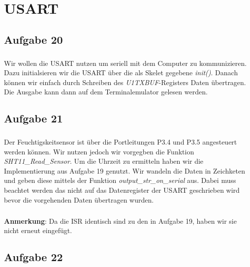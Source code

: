 \chapter{USART}

\section*{Aufgabe 20}

\paragraph*{}
Wir wollen die USART nutzen um seriell mit dem Computer zu kommunizieren. Dazu initialsieren wir die USART über die als Skelet gegebene {\em init()}. Danach können wir einfach durch Schreiben des {\em U1TXBUF}-Registers Daten übertragen. Die Ausgabe kann dann auf dem Terminalemulator gelesen werden.\\



\section*{Aufgabe 21}

\paragraph*{}
Der Feuchtigskeitsensor ist über die Portleitungen P3.4 und P3.5 angesteuert werden können. Wir nutzen jedoch wir vorgegben die Funktion {\em SHT11\_Read\_Sensor}. Um die Uhrzeit zu ermitteln haben wir die Implementierung aus Aufgabe 19 genutzt. Wir wandeln die Daten in Zeichketen und geben diese mittels der Funktion {\em output\_str\_on\_serial} aus. Dabei muss beachtet werden das nicht auf das Datenregister der USART geschrieben wird bevor die vorgehenden Daten übertragen wurden.\\



\paragraph*{}
\textbf{Anmerkung}: Da die ISR identisch sind zu den in Aufgabe 19, haben wir sie nicht erneut eingefügt.

\section{Aufgabe 22}

